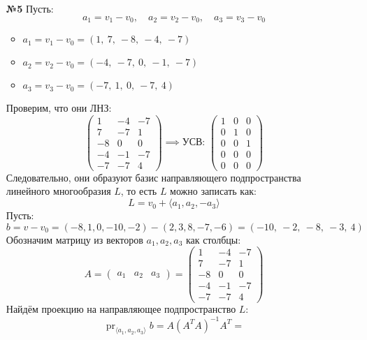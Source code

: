 \documentclass[a4paper]{article}
\newcommand{\pr}{\operatorname{pr}}
\begin{document}
\begin{enumerate}
    \item[\textbf{№5}]Пусть:
    $$a_1 = v_1 - v_0, \quad a_2 = v_2 - v_0, \quad a_3 = v_3 - v_0$$
    \begin{itemize}
        \item \( a_1 = v_1 - v_0 = (1,\ 7,\ -8,\ -4,\ -7) \)
        \item \( a_2 = v_2 - v_0 = (-4,\ -7,\ 0,\ -1,\ -7) \)
        \item \( a_3 = v_3 - v_0 = (-7,\ 1,\ 0,\ -7,\ 4) \)
    \end{itemize}
    Проверим, что они ЛНЗ:
   $$ \begin{pmatrix}
        1 & -4 & -7 \\
        7 & -7 & 1 \\
        -8 & 0 & 0 \\
        -4 & -1 & -7 \\
        -7 & -7 & 4
        \end{pmatrix} \implies \text{УСВ: } \begin{pmatrix}
            1 & 0 & 0 \\
            0 & 1 & 0 \\
            0 & 0 & 1 \\
            0 & 0 & 0 \\
            0 & 0 & 0
            \end{pmatrix}$$
    Следовательно, они образуют базис направляющего подпространства линейного многообразия $L$, то есть $L$ можно записать как:
    $$L = v_0 + \langle a_1, a_2, -a_3 \rangle$$
    Пусть:
    $$b = v-v_0 =  (-8, 1, 0, -10, -2) - (2, 3, 8, -7, -6) = (-10,\ -2,\ -8,\ -3,\ 4)$$
    Обозначим матрицу из векторов \( a_1, a_2, a_3 \) как столбцы:
    \[
    A = \begin{pmatrix} a_1 & a_2 & a_3 \end{pmatrix} = \begin{pmatrix}
        1 & -4 & -7 \\
        7 & -7 & 1 \\
        -8 & 0 & 0 \\
        -4 & -1 & -7 \\
        -7 & -7 & 4
        \end{pmatrix}
    \]
    Найдём проекцию на направляющее подпространство $L$:
    $$\pr_{\langle a_1, a_2, a_3 \rangle} b = A(A^TA)^{-1}A^{T} = $$


\end{enumerate}
\end{document}

